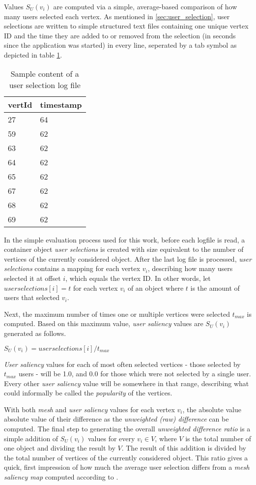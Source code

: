 Values $S_{U}(v_i)$ are computed via a simple, average-based comparison of how many users selected each vertex. As mentioned in \ref{sec:user_selection}, user selections are written to simple structured text files containing one unique vertex ID and the time they are added to or removed from the selection (in seconds since the application was started) in every line, seperated by a tab symbol as depicted in table \ref{tab:user_selection_log_file}.

\begin{table}[]
\centering
	\begin{tabular}{l|l}
	vertId & timestamp \\ \hline
	27 & 64 \\
	59 & 62 \\
	63 & 62 \\
	64 & 62 \\
	65 & 62 \\
	67 & 62 \\
	68 & 62 \\
	69 & 62
	\end{tabular}
	\caption{Sample content of a user selection log file}
	\label{tab:user_selection_log_file}
\end{table}

In the simple evaluation process used for this work, before each logfile is read, a container object \textit{user selections} is created with size equivalent to the number of vertices of the currently considered object. After the last log file is processed, \textit{user selections} contains a mapping for each vertex $v_i$, describing how many users selected it at offset $i$, which equals the vertex ID. In other words, let $userselections[i] = t$ for each vertex $v_i$ of an object where $t$ is the amount of users that selected $v_i$.

Next, the maximum number of times one or multiple vertices were selected $t_{max}$ is computed. Based on this maximum value, \textit{user saliency} values are $S_{U}(v_i)$ generated as follows.

$S_{U}(v_i) = userselections[i]/t_{max}$

\textit{User saliency} values for each of most often selected vertices - those selected by $t_{max}$ users - will be 1.0, and 0.0 for those which were not selected by a single user. Every other \textit{user saliency} value will be somewhere in that range, describing what could informally be called the \textit{popularity} of the vertices.

With both \textit{mesh} and \textit{user saliency} values for each vertex $v_i$, the absolute value absolute value of their difference as the \textit{unweighted (raw) difference} can be computed. The final step to generating the overall \textit{unweighted difference ratio} is a simple addition of $S_{U}(v_i)$ values for every $v_i \in V$, where $V$ is the total number of one object and dividing the result by $V$. The result of this addition is divided by the total number of vertices of the currently considered object. This ratio gives a quick, first impression of how much the average user selection differs from a \textit{mesh saliency map} computed according to \cite{lee2005mesh}.

